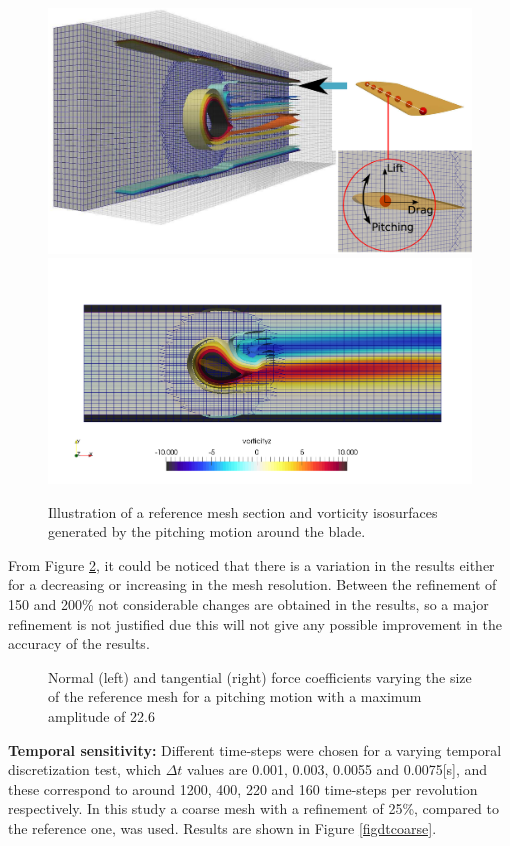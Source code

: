\documentclass[a4paper]{jpconf}
\begin{document}
\begin{figure}[h]
\begin{minipage}{36pc}
\includegraphics[width=0.5\columnwidth]{vorticityZ2.eps}
\includegraphics[width=0.5\columnwidth]{vorticityZ.png}
\end{minipage}%
\caption{\label{figrefmesh} Illustration of a reference mesh section and vorticity isosurfaces generated by the pitching motion around the blade.}
\end{figure}

From Figure \ref{figmesh}, it could be noticed that there is a  variation in the results either for a decreasing or increasing in the mesh resolution. Between the refinement of 150 and 200\% not considerable changes are obtained in the results, so a major refinement is not justified due this will not give any possible improvement in the accuracy of the results.

\begin{figure}[h]
\begin{minipage}{18pc}
\resizebox{\columnwidth}{!}{}
\end{minipage}\hspace{2pc}%
\begin{minipage}{18pc}
\resizebox{\columnwidth}{!}{}
\end{minipage}
\caption{\label{figmesh}Normal (left) and tangential (right) force coefficients varying the size of the reference mesh for a pitching motion with a maximum amplitude of 22.6\degree\ }
\end{figure}

\textbf{Temporal sensitivity:} Different time-steps were chosen for a varying temporal discretization test, which $\Delta t$ values are 0.001, 0.003, 0.0055 and 0.0075[s], and these correspond to around 1200, 400, 220 and 160 time-steps per revolution respectively. In this study a coarse mesh with a refinement of 25\%, compared to the reference one, was used. Results are shown in Figure \ref{figdtcoarse}.
\end{document}
